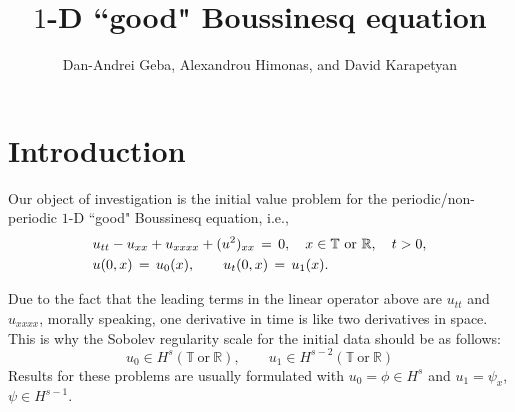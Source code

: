 \documentclass[12pt,reqno]{amsart}
\numberwithin{equation}{section}  %
\numberwithin{figure}{section}
\theoremstyle{plain}
\theoremstyle{definition}
\theoremstyle{remark}
\begin{document}
\title{$1$-D ``good" Boussinesq equation}

\author{Dan-Andrei Geba, Alexandrou Himonas, and David Karapetyan}

\address{Department of Mathematics, University of Rochester, Rochester, NY 14627}
\address{Department of Mathematics, University of Notre Dame, Notre Dame, IN 46556}
\address{Department of Mathematics, University of Notre Dame, Notre Dame, IN 46556}
\date{}



\maketitle
%
\section{Introduction}
Our object of investigation is the initial value problem for the periodic/non-periodic $1$-D ``good" Boussinesq equation, i.e.,
\begin{equation}
  \aligned
  &u_{tt}-u_{xx}+u_{xxxx}+(u^2)_{xx}\,=\,0, \quad x\in \mathbb{T}\ \text{or} \ \mathbb{R}, \quad t>0,\\
&u(0,x)\,=\,u_0(x),\qquad u_t(0,x)\,=\,u_1(x).\endaligned
\label{main}
\end{equation}

Due to the fact that the leading terms in the linear operator above are $u_{tt}$ and $u_{xxxx}$, morally speaking, one derivative in time is like two derivatives in space. This is why the Sobolev regularity scale for the initial data should be as follows:
\[
u_0\in H^s(\mathbb{T}\ \text{or} \ \mathbb{R}), \qquad u_1\in H^{s-2}(\mathbb{T}\ \text{or} \ \mathbb{R})
\]
Results for these problems are usually formulated with $u_0=\phi \in H^s$ and $u_1=\psi_x$, $\psi\in H^{s-1}$.
\end{document}
